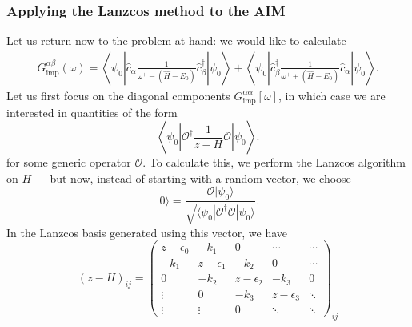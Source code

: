\documentclass[10pt,a4paper,final]{article}
\newcommand{\bra}[1]{\langle #1|}
\newcommand{\ket}[1]{|#1\rangle}
\begin{document}
\subsubsection{Applying the Lanzcos method to the AIM}
Let us return now to the problem at hand: we would like to calculate 
%
\begin{align*}
G_\text{imp}^{\alpha\beta}(\omega) = \left\langle \psi_0 \left| \hat c_\alpha \frac{1}{\omega^+-(\hat H - E_0)} \hat c^\dag_\beta \right| \psi_0 \right\rangle
  + \left\langle \psi_0 \left| \hat c^\dag_\beta \frac{1}{\omega^++(\hat H - E_0)} \hat c_\alpha \right| \psi_0 \right\rangle.
\end{align*}
%
Let us first focus on the diagonal components $G_\text{imp}^{\alpha\alpha}[\omega]$, in which case we are interested in quantities of the form
%
\begin{equation}
\left\langle \psi_0 \left| \mathcal{O}^\dag \frac{1}{z-H} \mathcal{O} \right| \psi_0 \right\rangle.
\label{eqn:DMFT_Lanzcos_Gimp_simplified_term}
\end{equation}
%
for some generic operator $\mathcal{O}$. To calculate this, we perform the Lanzcos algorithm on $H$ --- but now, instead of starting with a random vector, we choose
%
\begin{equation}
\ket{0} = \frac{\mathcal{O}\ket{\psi_0}}{\sqrt{\bra{\psi_0}\mathcal{O}^\dag \mathcal{O}\ket{\psi_0}}}.
\label{eqn:DMFT_Lanzcos_initial_vector}
\end{equation}
In the Lanzcos basis generated using this vector, we have
%
\begin{equation}
(z-H)_{ij} = \begin{pmatrix}
z-\epsilon_0 & -k_1         & 0            & \cdots       & \cdots \\
-k_1         & z-\epsilon_1 & -k_2         & 0            & \cdots \\
0            & -k_2         & z-\epsilon_2 & -k_3         & 0      \\
\vdots       & 0            & -k_3         & z-\epsilon_3 & \ddots \\
\vdots       & \vdots       & 0            & \ddots       & \ddots
\end{pmatrix}_{ij}
\end{equation}
%
\end{document}
